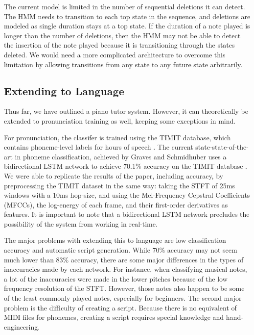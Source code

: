 \documentclass[twocolumn]{article}
\begin{document}
The current model is limited in the number of sequential deletions it can detect. The HMM needs to transition to each top state in the sequence, and deletions are modeled as single duration stays at a top state. If the duration of a note played is longer than the number of deletions, then the HMM may not be able to detect the insertion of the note played because it is transitioning through the states deleted. We would need a more complicated architecture to overcome this limitation by allowing transitions from any state to any future state arbitrarily.

\subsection{Extending to Language}

Thus far, we have outlined a piano tutor system. However, it can theoretically be extended to pronunciation training as well, keeping some exceptions in mind.

For pronunciation, the classifer is trained using the TIMIT database, which contains phoneme-level labels for hours of speech \cite{garofolo1993darpa}. The current state-state-of-the-art in phoneme classification, achieved by Graves and Schmidhuber uses a bidirectional LSTM network to achieve 70.1\% accuracy on the TIMIT database \cite{graves2005framewise}. We were able to replicate the results of the paper, including accuracy, by preprocessing the TIMIT dataset in the same way: taking the STFT of 25ms windows with a 10ms hop-size, and using the Mel-Frequency Cepstral Coefficients (MFCCs), the log-energy of each frame, and their first-order derivatives as features. It is important to note that a bidirectional LSTM network precludes the possibility of the system from working in real-time.

The major problems with extending this to language are low classification accuracy and automatic script generation. While 70\% accuracy may not seem much lower than 83\% accuracy, there are some major differences in the types of inaccuracies made by each network. For instance, when classifying musical notes, a lot of the inaccuracies were made in the lower pitches because of the low frequency resolution of the STFT. However, those notes also happen to be some of the least commonly played notes, especially for beginners. The second major problem is the difficulty of creating a script. Because there is no equivalent of MIDI files for phonemes, creating a script requires special knowledge and hand-engineering.
\end{document}

